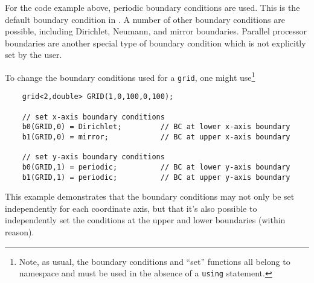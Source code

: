For the code example above, periodic boundary conditions are used.  This is the default boundary condition in \MMSP.  A number of other boundary conditions are possible, including Dirichlet, Neumann, and mirror boundaries.  Parallel processor boundaries are another special type of boundary condition which is not explicitly set by the user.

To change the boundary conditions used for a {\tt grid}, one might use\footnote{Note, as usual, the boundary conditions and ``set'' functions all belong to namespace \MMSP and must be used in the absence of a {\tt using} statement.}
\begin{shadebox}
\begin{verbatim}
    grid<2,double> GRID(1,0,100,0,100);

    // set x-axis boundary conditions
    b0(GRID,0) = Dirichlet;         // BC at lower x-axis boundary
    b1(GRID,0) = mirror;            // BC at upper x-axis boundary

    // set y-axis boundary conditions
    b0(GRID,1) = periodic;          // BC at lower y-axis boundary
    b1(GRID,1) = periodic;          // BC at upper y-axis boundary
\end{verbatim}
\end{shadebox}
This example demonstrates that the boundary conditions may not only be set independently for each coordinate axis, but that it's also possible to independently set the conditions at the upper and lower boundaries (within reason).



